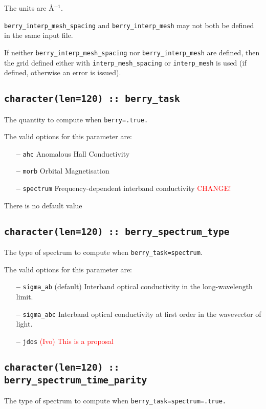 The units are \AA$^{-1}$.

{\tt berry\_interp\_mesh\_spacing} and  {\tt berry\_interp\_mesh} may not both be defined in the same input file.

If neither {\tt berry\_interp\_mesh\_spacing} nor  {\tt berry\_interp\_mesh} are defined, then the grid defined either with {\tt interp\_mesh\_spacing} or {\tt interp\_mesh} is used (if defined, otherwise an error is issued).



\subsection[berry\_task]{\tt character(len=120) ::  berry\_task}
The quantity to compute when {\tt berry=.true.}

The valid options for this parameter are:
\begin{itemize}
\item[{\bf --}]  \verb#ahc# Anomalous Hall Conductivity
\item[{\bf --}]  \verb#morb# Orbital Magnetisation
\item[{\bf --}] \verb#spectrum# Frequency-dependent interband conductivity \textcolor{red}{CHANGE!}

\end{itemize}
There is no default value



\subsection[berry\_spectrum\_type]{\tt character(len=120) ::  berry\_spectrum\_type}
The type of spectrum to compute when {\tt berry\_task=spectrum}. 

The valid options for this parameter are:
\begin{itemize}
\item[{\bf --}]  \verb#sigma_ab# (default) Interband optical conductivity
in the long-wavelength limit.
\item[{\bf --}]  \verb#sigma_abc# Interband optical conductivity
at first order in the wavevector of light.
\item [{\bf --}]  \verb#jdos# \textcolor{red}{(Ivo) This is a proposal}
\end{itemize}

\subsection[berry\_spectrum\_time\_parity]{\tt character(len=120) ::  berry\_spectrum\_time\_parity}
The type of spectrum to compute when {\tt berry\_task=spectrum=.true.} 


